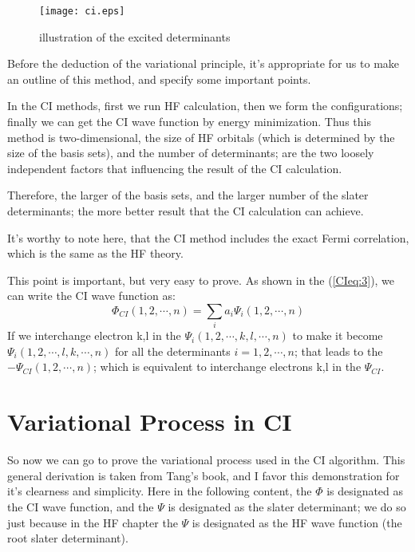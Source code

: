 \begin{figure}[htp]
  \begin{center}
    \texttt{[image: ci.eps]}\label{CI1}
    \caption{illustration of the excited determinants}
  \end{center}
\end{figure}

Before the deduction of the variational principle, it's appropriate
for us to make an outline of this method, and specify some important
points.

In the CI methods, first we run HF calculation, then we form the
configurations; finally we can get the CI wave function by energy
minimization. Thus this method is two-dimensional, the size of HF
orbitals (which is determined by the size of the basis sets), and the
number of determinants; are the two loosely independent factors that
influencing the result of the CI calculation.

Therefore, the larger of the basis sets, and the larger number of the
slater determinants; the more better result that the CI calculation
can achieve.

It's worthy to note here, that the CI method includes the exact Fermi
correlation, which is the same as the HF theory.

This point is important, but very easy to prove. As shown in the
(\ref{CIeq:3}), we can write the CI wave function as:
\begin{equation}\label{}
  \Phi_{CI} (1,2,\cdots, n) = \sum _{i}a_{i}\Psi_{i} (1,2,\cdots, n)
\end{equation}
If we interchange electron k,l in the $\Psi_{i} (1,2, \cdots, k,l,
\cdots, n)$ to make it become $\Psi_{i} (1,2, \cdots, l,k, \cdots, n)$
for all the determinants $i=1,2, \cdots, n$; that leads to the
$-\Psi_{CI}(1,2,\cdots, n)$; which is equivalent to interchange
electrons k,l in the $\Psi_{CI}$.


\section{Variational Process in CI}
%
%
%
%
So now we can go to prove the variational process used in the CI
algorithm. This general derivation is taken from Tang's
book\cite{aoqingTang}, and I favor this demonstration for it's
clearness and simplicity. Here in the following content, the $\Phi$ is
designated as the CI wave function, and the $\Psi$ is designated as
the slater determinant; we do so just because in the HF chapter the
$\Psi$ is designated as the HF wave function (the root slater
determinant).

